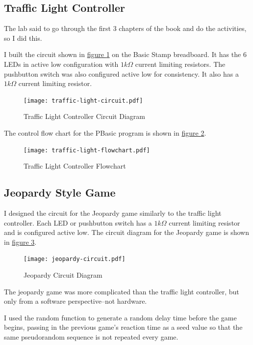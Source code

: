 \documentclass[11pt]{article}
\begin{document}
\subsection{Traffic Light Controller}

The lab said to go through the first 3 chapters of the book and do the activities, so I did this.

I built the circuit shown in \hyperref[traffic-light-circuit]{figure \ref{traffic-light-circuit}} on the Basic Stamp breadboard.
It has the 6 LEDs in active low configuration with $1k\Omega$ current limiting resistors.
The pushbutton switch was also configured active low for consistency.
It also has a $1k\Omega$ current limiting resistor.

\begin{figure}[h!]
\centering
\texttt{[image: traffic-light-circuit.pdf]}
\caption{Traffic Light Controller Circuit Diagram}
\label{traffic-light-circuit}
\end{figure}

The control flow chart for the PBasic program is shown in \hyperref[traffic-light-flowchart]{figure \ref{traffic-light-flowchart}}.

\begin{figure}[ht]
\centering
\texttt{[image: traffic-light-flowchart.pdf]}
\caption{Traffic Light Controller Flowchart}
\label{traffic-light-flowchart}
\end{figure}

\subsection{Jeopardy Style Game}

I designed the circuit for the Jeopardy game similarly to the traffic light controller.
Each LED or pushbutton switch has a $1k\Omega$ current limiting resistor and is configured active low.
The circuit diagram for the Jeopardy game is shown in \hyperref[jeopardy-circuit]{figure \ref{jeopardy-circuit}}.

\begin{figure}[h!]
\centering
\texttt{[image: jeopardy-circuit.pdf]}
\caption{Jeopardy Circuit Diagram}
\label{jeopardy-circuit}
\end{figure}

The jeopardy game was more complicated than the traffic light controller,
but only from a software perspective--not hardware.

I used the random function to generate a random delay time before the game begins,
passing in the previous game's reaction time as a seed value so that the same
pseudorandom sequence is not repeated every game.
\end{document}
